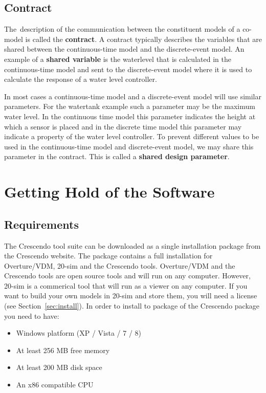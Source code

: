 \documentclass{crescendorepchap}
\begin{document}
\section{Contract}

The~description of the communication between the constituent models of a
co-model is called the \textbf{contract}. A contract typically describes
the variables that are shared between the continuous-time model and the
discrete-event model. An example of a \textbf{shared variable} is the
waterlevel that is calculated in the continuous-time model and sent to
the discrete-event model where it is used to calculate the response of a
water level controller.

In most cases a continuous-time model and a discrete-event model will
use similar parameters. For the watertank example such a parameter may
be the maximum water level. In the continuous time model this parameter
indicates the height at which a sensor is placed and in the discrete
time model this parameter may indicate a property of the water level
controller. To prevent different values to be used in the
continuous-time model and discrete-event model, we may share this
parameter in the contract. This is called a \textbf{shared design
parameter}.

\chapter{Getting Hold of the Software}\label{chap:getting}

\section{Requirements}

The Crescendo tool suite can be downloaded as a single installation
package from the Crescendo website. The package contains a
full installation for Overture/VDM, 20-sim and the
Crescendo tools. Overture/VDM and the Crescendo tools are open source tools and
will run on any computer. However, 20-sim is a commerical tool that will run as a
viewer on any computer. If you want to build your own models in 20-sim
and store them, you will need a license (see Section~\ref{sec:install}). In order to install to package of the Crescendo package you need to have:

\begin{itemize}
\item
  Windows platform (XP / Vista / 7 / 8)
\item At least
  256 MB free memory
\item At least
  200 MB disk space
\item An
  x86 compatible CPU
\end{itemize}
\end{document}
